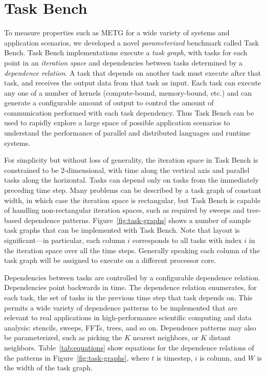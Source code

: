 \section{Task Bench}
\label{sec:task-bench}

To measure properties such as METG for a wide variety of
systems and application scenarios, we developed a novel
\emph{parameterized} benchmark called Task Bench. Task Bench
implementations execute a \emph{task graph}, with tasks for each point
in an \emph{iteration space} and dependencies between tasks determined
by a \emph{dependence relation}. A task that depends on another task
must execute after that task, and receives the output data from that
task as input. Each task can execute any one of a
number of kernels (compute-bound, memory-bound, etc.) and can generate
a configurable amount of output to control the amount of communication
performed with each task dependency. Thus Task Bench can be used to
rapidly explore a large space of possible application scenarios to
understand the performance of parallel and
distributed languages and runtime systems.

For simplicity but without loss of generality, the iteration space in
Task Bench is constrained to be 2-dimensional, with time along
the vertical axis and parallel tasks along the
horizontal. Tasks can depend only on tasks from the immediately
preceding time step. Many problems can be described by a task graph of
constant width, in which case the iteration space is rectangular, but
Task Bench is capable of handling non-rectangular iteration spaces,
such as required by sweeps and tree-based dependence
patterns. Figure~\ref{fig:task-graphs} shows a number of sample task
graphs that can be implemented with Task Bench. Note that layout is
significant---in particular, each column $i$ corresponds to all tasks
with index $i$ in the iteration space over all the time
steps. Generally speaking each column of the task graph will be
assigned to execute on a different processor core.

Dependencies between tasks are controlled by a configurable dependence
relation. Dependencies point backwards in time. The
dependence relation enumerates, for each task, the set of tasks in the
previous time step that task depends on. This permits a wide variety
of dependence patterns to be implemented that are relevant to real
applications in high-performance scientific computing and data analysis: stencils,
sweeps, FFTs, trees, and so on. Dependence patterns may also be
parameterized, such as picking the $K$ nearest neighbors, or $K$
distant neighbors. Table~\ref{tab:equations} show equations for the
dependence relations of the patterns in Figure~\ref{fig:task-graphs},
where $t$ is timestep, $i$ is column, and $W$ is the width of the task
graph.

